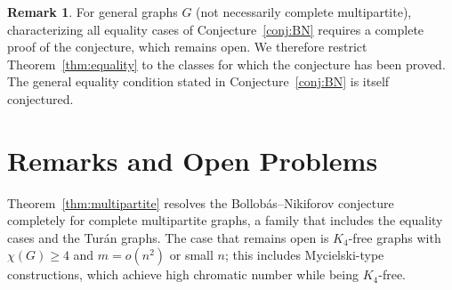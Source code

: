 \documentclass[preprint,12pt]{elsarticle}
\theoremstyle{plain}
\theoremstyle{definition}
\newtheorem{remark}[theorem]{Remark}
\begin{document}
\begin{remark}
  For general graphs $G$ (not necessarily complete multipartite),
  characterizing all equality cases of Conjecture~\ref{conj:BN} requires
  a complete proof of the conjecture, which remains open.
  We therefore restrict Theorem~\ref{thm:equality} to the classes for which
  the conjecture has been proved.
  The general equality condition stated in Conjecture~\ref{conj:BN} is
  itself conjectured.
\end{remark}

\section{Remarks and Open Problems}
\label{sec:remarks}

Theorem~\ref{thm:multipartite} resolves the Bollob\'as--Nikiforov
conjecture completely for complete multipartite graphs, a family that
includes the equality cases and the Tur\'an graphs.
The case that remains open is $K_4$-free graphs with $\chi(G) \geq 4$
and $m = o(n^2)$ or small $n$; this includes Mycielski-type constructions,
which achieve high chromatic number while being $K_4$-free.
\end{document}
